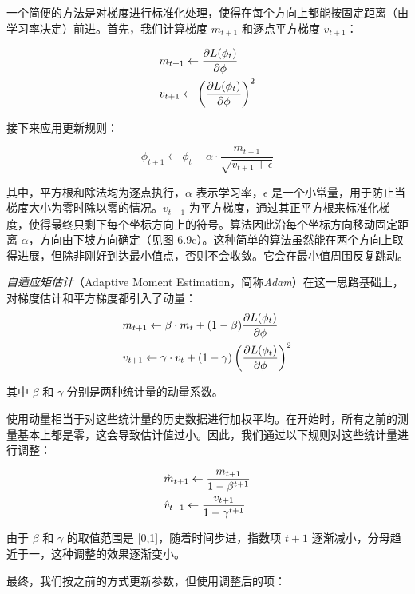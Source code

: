 一个简便的方法是对梯度进行标准化处理，使得在每个方向上都能按固定距离（由学习率决定）前进。首先，我们计算梯度 \(m_{t+1}\) 和逐点平方梯度 \(v_{t+1}\)：

\begin{align}
& m_{t+1} \leftarrow \frac{\partial L(\phi_t)}{\partial \phi} \notag \\
& v_{t+1} \leftarrow \left( \frac{\partial L(\phi_t)}{\partial \phi} \right)^2
\end{align}


接下来应用更新规则：

\begin{equation}
\phi_{t+1} \leftarrow \phi_t - \alpha \cdot \frac{m_{t+1}}{\sqrt{v_{t+1} + \epsilon}} 
\end{equation}

其中，平方根和除法均为逐点执行，\(\alpha\) 表示学习率，\(\epsilon\) 是一个小常量，用于防止当梯度大小为零时除以零的情况。\(v_{t+1}\) 为平方梯度，通过其正平方根来标准化梯度，使得最终只剩下每个坐标方向上的符号。算法因此沿每个坐标方向移动固定距离 \(\alpha\)，方向由下坡方向确定（见图 6.9c）。这种简单的算法虽然能在两个方向上取得进展，但除非刚好到达最小值点，否则不会收敛。它会在最小值周围反复跳动。

\textit{自适应矩估计}（Adaptive Moment Estimation，简称\textit{Adam}）在这一思路基础上，对梯度估计和平方梯度都引入了动量：
\begin{align}
&m_{t+1} \leftarrow \beta \cdot m_t + (1 - \beta) \frac{\partial L(\phi_t)}{\partial \phi} \notag \\
&v_{t+1} \leftarrow \gamma \cdot v_t + (1 - \gamma) \left( \frac{\partial L(\phi_t)}{\partial \phi} \right)^2
\end{align}

其中 \(\beta\) 和 \(\gamma\) 分别是两种统计量的动量系数。

使用动量相当于对这些统计量的历史数据进行加权平均。在开始时，所有之前的测量基本上都是零，这会导致估计值过小。因此，我们通过以下规则对这些统计量进行调整：

\begin{align}
& \hat{m}_{t+1} \leftarrow \frac{m_{t+1}}{1 - \beta^{t+1}} \notag \\
& \hat{v}_{t+1} \leftarrow \frac{v_{t+1}}{1 - \gamma^{t+1}} 
\end{align}


由于 \(\beta\) 和 \(\gamma\) 的取值范围是 [0,1]，随着时间步进，指数项 \(t+1\) 逐渐减小，分母趋近于一，这种调整的效果逐渐变小。

最终，我们按之前的方式更新参数，但使用调整后的项：

